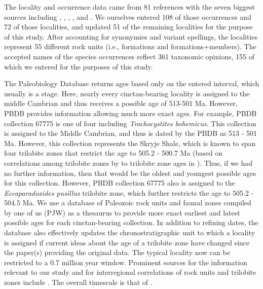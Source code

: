 \documentclass{article}
\begin{document}
The locality and occurrence data came from 81 references with the seven biggest sources including \citet{Nardin2017}, \citet{Zamora2009}, \citet{Chlupac1998}, \citet{Sprinkle2006}, \citet{Termier1973} and \citet{Sprinkle1973}. We ourselves entered 108 of those occurrences and 72 of those localities, and updated 51 of the remaining localities for the purpose of this study.  After accounting for synonymies and variant spellings, the localities represent 55 different rock units (i.e., formations and formations+members).  The accepted names of the species occurrences reflect 361 taxonomic opinions, 155 of which we entered for the purposes of this study.

The Paleobiology Database returns ages based only on the entered interval, which usually is a stage. Here, nearly every cinctan-bearing locality is assigned to the middle Cambrian and thus receives a possible age of 513-501 Ma. However, PBDB provides information allowing much more exact ages. For example, PBDB collection 67775 is one of four including \textit{Trochocystites bohemicus}. This collection is assigned to the Middle Cambrian, and thus is dated by the PBDB as 513 - 501 Ma. However, this collection represents the Skryje Shale, which is known to span four trilobite zones that restrict the age to 505.2 - 500.7 Ma (based on correlations among trilobite zones by \citealp{Geyer2019} to trilobite zone ages in \citealp{Gradstein2012}). Thus, if we had no further information, then that would be the oldest and youngest possible ages for this collection. However, PBDB collection 67775 also is assigned to the \textit{Eccaparadoxides pusillus} trilobite zone, which further restricts the age to 505.2 - 504.5 Ma. We use a database of Paleozoic rock units and faunal zones compiled by one of us (PJW) as a thesaurus to provide more exact earliest and latest possible ages for each cinctan-bearing collection. In addition to refining dates, the database also effectively updates the chronostratigraphic unit to which a locality is assigned if current ideas about the age of a trilobite zone have changed since the paper(s) providing the original data. The typical locality now can be restricted to a 0.7 million year window. Prominent sources for the information relevant to our study and for interregional correlations of rock units and trilobite zones include \cite{Alvaro2001, Linan2004, Geyer2006, Geyer2000, Alvaro2007, Geyer2019}.  The overall timescale is that of \cite{Gradstein2012}. 
\end{document}
